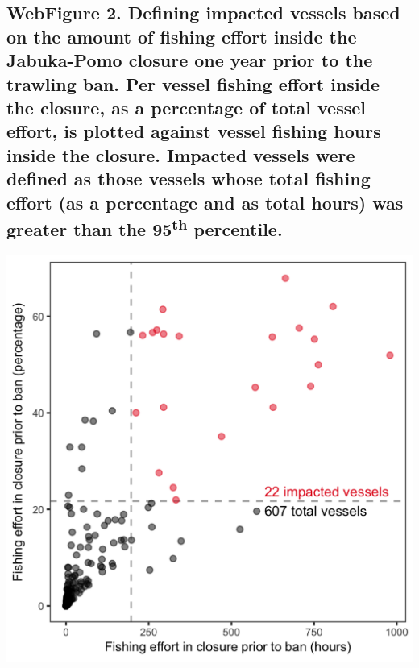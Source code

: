 \documentclass[11pt,]{article}
\begin{document}
\subsection{\texorpdfstring{WebFigure 2. Defining impacted vessels based
on the amount of fishing effort inside the Jabuka-Pomo closure one year
prior to the trawling ban. Per vessel fishing effort inside the closure,
as a percentage of total vessel effort, is plotted against vessel
fishing hours inside the closure. Impacted vessels were defined as those
vessels whose total fishing effort (as a percentage and as total hours)
was greater than the 95\textsuperscript{th}
percentile.}{WebFigure 2. Defining impacted vessels based on the amount of fishing effort inside the Jabuka-Pomo closure one year prior to the trawling ban. Per vessel fishing effort inside the closure, as a percentage of total vessel effort, is plotted against vessel fishing hours inside the closure. Impacted vessels were defined as those vessels whose total fishing effort (as a percentage and as total hours) was greater than the 95th percentile.}}\label{webfigure-2.-defining-impacted-vessels-based-on-the-amount-of-fishing-effort-inside-the-jabuka-pomo-closure-one-year-prior-to-the-trawling-ban.-per-vessel-fishing-effort-inside-the-closure-as-a-percentage-of-total-vessel-effort-is-plotted-against-vessel-fishing-hours-inside-the-closure.-impacted-vessels-were-defined-as-those-vessels-whose-total-fishing-effort-as-a-percentage-and-as-total-hours-was-greater-than-the-95th-percentile.}

\includegraphics[width=1.00000\textwidth]{../workspace/process_effort_figs/displacement_threshold_scatter.png}
\end{document}
